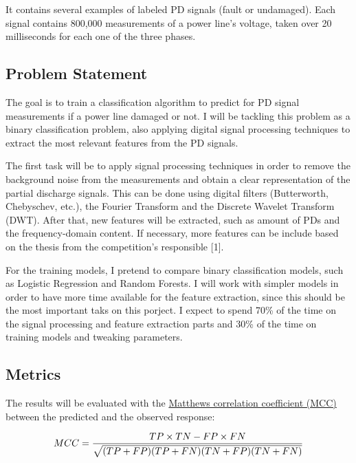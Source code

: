 \documentclass[11pt]{article}
\begin{document}
It contains several examples of labeled PD signals (fault or undamaged).
Each signal contains 800,000 measurements of a power line's voltage,
taken over 20 milliseconds for each one of the three phases.

\hypertarget{problem-statement}{%
\subsection{Problem Statement}\label{problem-statement}}

The goal is to train a classification algorithm to predict for PD signal
measurements if a power line damaged or not. I will be tackling this
problem as a binary classification problem, also applying digital signal
processing techniques to extract the most relevant features from the PD
signals.

The first task will be to apply signal processing techniques in order to
remove the background noise from the measurements and obtain a clear
representation of the partial discharge signals. This can be done using
digital filters (Butterworth, Chebyschev, etc.), the Fourier Transform
and the Discrete Wavelet Transform (DWT). After that, new features will
be extracted, such as amount of PDs and the frequency-domain content. If
necessary, more features can be include based on the thesis from the
competition's responsible {[}1{]}.

For the training models, I pretend to compare binary classification
models, such as Logistic Regression and Random Forests. I will work with
simpler models in order to have more time available for the feature
extraction, since this should be the most important taks on this
porject. I expect to spend 70\% of the time on the signal processing and
feature extraction parts and 30\% of the time on training models and
tweaking parameters.

\hypertarget{metrics}{%
\subsection{Metrics}\label{metrics}}

The results will be evaluated with the
\href{https://en.wikipedia.org/wiki/Matthews_correlation_coefficient}{Matthews
correlation coefficient (MCC)} between the predicted and the observed
response:

\begin{equation}
\centering
MCC = \dfrac{TP \times TN - FP \times FN}{\sqrt{(TP + FP)(TP + FN)(TN + FP)(TN + FN)}}
\end{equation}
\end{document}

